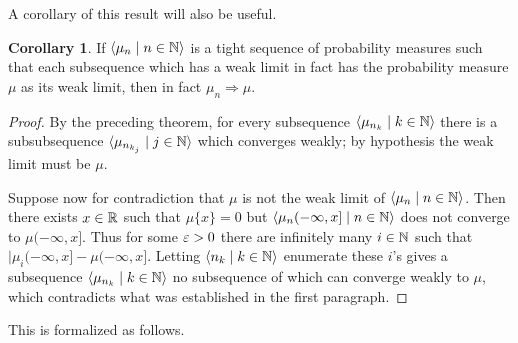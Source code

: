 \documentclass{article}
\theoremstyle{definition}
\newtheorem{corollary}[theorem]{Corollary}
\newcommand{\bldseq}[2]{\langle{#1}\mid{#2}\rangle}
\begin{document}
\medskip

A corollary of this result will also be useful.

\begin{corollary}
If $\bldseq{\mu_n}{n \in \N}$ is a tight sequence of probability measures such that each subsequence which has a weak limit in fact has the probability measure $\mu$ as its weak limit, then in fact $\mu_n \Rightarrow \mu$.
\end{corollary}

\begin{proof}
By the preceding theorem, for every subsequence $\bldseq{\mu_{n_k}}{k \in \N}$ there is a subsubsequence $\bldseq{\mu_{n_{k_j}}}{j \in \N}$ which converges weakly; by hypothesis the weak limit must be $\mu$.

Suppose now for contradiction that $\mu$ is not the weak limit of $\bldseq{\mu_n}{n \in \N}$. Then there exists $x \in \mathbb{R}$ such that $\mu \{x\} = 0$ but $\bldseq{\mu_n (-\infty, x]}{n \in \N}$ does not converge to $\mu (-\infty, x]$. Thus for some $\varepsilon > 0$ there are infinitely many $i \in \mathbb{N}$ such that $|\mu_i (-\infty, x] - \mu (-\infty, x]$. Letting $\bldseq{n_k}{k \in \N}$ enumerate these $i$'s gives a subsequence $\bldseq{\mu_{n_k}}{k \in \N}$ no subsequence of which can converge weakly to $\mu$, which contradicts what was established in the first paragraph.
\end{proof}

This is formalized as follows.

\medskip
\end{document}
